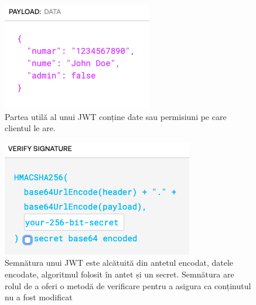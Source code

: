 \documentclass[12pt]{article}
\begin{document}
\begin{figure}[H]
    \begin{minipage}[c]{0.5\textwidth}
        \includegraphics[width=\textwidth]{jwt-payload.png}
    \end{minipage}\hfill
    \begin{minipage}[c]{0.5\textwidth}
        \caption{Partea utilă al unui JWT conține date sau permisiuni
        pe care clientul le are.}
    \end{minipage}
\end{figure}

\begin{figure}[H]
    \begin{minipage}[c]{0.5\textwidth}
        \includegraphics[width=\textwidth]{jwt-sign.png}
    \end{minipage}\hfill
    \begin{minipage}[c]{0.5\textwidth}
        \caption{Semnătura unui JWT este alcătuită din antetul encodat, 
        datele encodate, algoritmul folosit în antet și un secret. Semnătura are rolul
        de a oferi o metodă de verificare pentru a asigura ca conținutul nu a fost 
        modificat }
    \end{minipage}
\end{figure}
\end{document}
